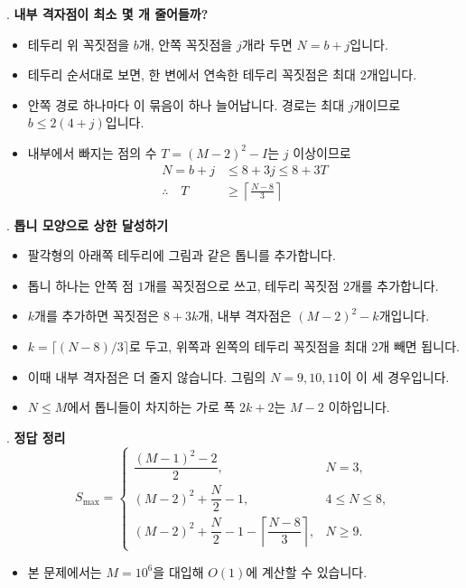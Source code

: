\begin{frame}{\textbf{\pletter}. \ptitle}
    \textbf{내부 격자점이 최소 몇 개 줄어들까?}
    \begin{itemize}
        \item 테두리 위 꼭짓점을 $b$개, 안쪽 꼭짓점을 $j$개라 두면 $N=b+j$입니다.
        \item 테두리 순서대로 보면, 한 변에서 연속한 테두리 꼭짓점은 최대 $2$개입니다.
        \item 안쪽 경로 하나마다 이 묶음이 하나 늘어납니다. 경로는 최대 $j$개이므로 $b\le2(4+j)$입니다.
        \item 내부에서 빠지는 점의 수 $T=(M-2)^2-I$는 $j$ 이상이므로
        \[
            \begin{aligned}
                N=b+j&\le8+3j\le8+3T\\[3pt]
                \therefore\quad T&\ge\left\lceil\frac{N-8}{3}\right\rceil
            \end{aligned}
        \]
    \end{itemize}
\end{frame}

\begin{frame}{\textbf{\pletter}. \ptitle}
    \textbf{톱니 모양으로 상한 달성하기}
    \begin{itemize}
        \item 팔각형의 아래쪽 테두리에 그림과 같은 톱니를 추가합니다.
        \item 톱니 하나는 안쪽 점 $1$개를 꼭짓점으로 쓰고, 테두리 꼭짓점 $2$개를 추가합니다.
        \item $k$개를 추가하면 꼭짓점은 $8+3k$개, 내부 격자점은 $(M-2)^2-k$개입니다.
        \item $k=\lceil(N-8)/3\rceil$로 두고, 위쪽과 왼쪽의 테두리 꼭짓점을 최대 $2$개 빼면 됩니다.
        \item 이때 내부 격자점은 더 줄지 않습니다. 그림의 $N=9,10,11$이 이 세 경우입니다.
        \item $N\le M$에서 톱니들이 차지하는 가로 폭 $2k+2$는 $M-2$ 이하입니다.
    \end{itemize}
\end{frame}

\begin{frame}{\textbf{\pletter}. \ptitle}
    \textbf{정답 정리}
    \[
        \boxed{
        S_{\max}=
        \begin{cases}
            \dfrac{(M-1)^2-2}{2}, & N=3,\\[6pt]
            (M-2)^2+\dfrac{N}{2}-1, & 4\le N\le8,\\[6pt]
            (M-2)^2+\dfrac{N}{2}-1-\left\lceil\dfrac{N-8}{3}\right\rceil, & N\ge9.
        \end{cases}}
    \]
    \begin{itemize}
        \item 본 문제에서는 $M=10^6$을 대입해 $O(1)$에 계산할 수 있습니다.
    \end{itemize}
\end{frame}
